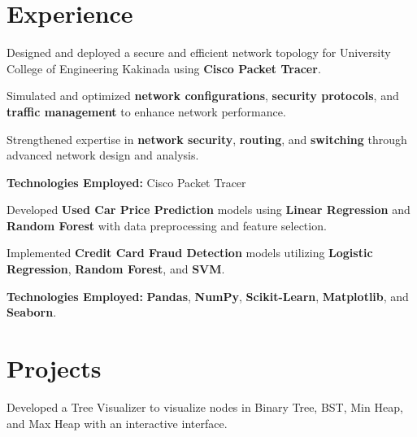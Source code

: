 \documentclass[]{deedy-resume-openfont}
\begin{document}
\begin{minipage}[t]{0.66\textwidth} 


\section{Experience}

\vspace{\topsep} %
\begin{tightemize}
 \item Designed and deployed a secure and efficient network topology for University College of Engineering Kakinada using \textbf{Cisco Packet Tracer}.  
\item Simulated and optimized \textbf{network configurations}, \textbf{security protocols}, and \textbf{traffic management} to enhance network performance.  
\item Strengthened expertise in \textbf{network security}, \textbf{routing}, and \textbf{switching} through advanced network design and analysis.  

\item \textbf{Technologies Employed:} Cisco Packet Tracer
\end{tightemize}
\sectionsep

\begin{tightemize}
    \item Developed \textbf{Used Car Price Prediction} models using \textbf{Linear Regression} and \textbf{Random Forest} with data preprocessing and feature selection.
    \item Implemented \textbf{Credit Card Fraud Detection} models utilizing \textbf{Logistic Regression}, \textbf{Random Forest}, and \textbf{SVM}. 
\item \textbf{Technologies Employed:}  \textbf{Pandas}, \textbf{NumPy}, \textbf{Scikit-Learn}, \textbf{Matplotlib}, and \textbf{Seaborn}.  

\end{tightemize}
\sectionsep



\section{Projects}
\begin{normalsize} %
\begin{tightemize}
    \item Developed a Tree Visualizer to visualize nodes in Binary Tree, BST, Min Heap, and Max Heap with an interactive interface.
   

\end{tightemize}
\end{normalsize}
\end{minipage}
\end{document}
